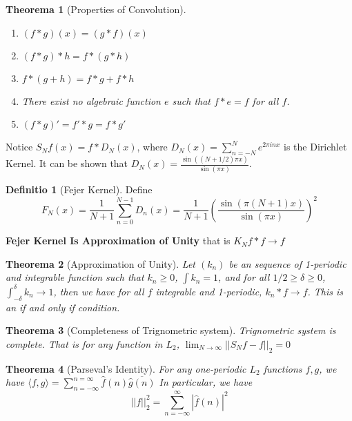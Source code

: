 \documentclass[12pt, a4paper]{article}
\newtheorem{theorem}{Theorema}
\theoremstyle{definition}
\newtheorem{definition}{Definitio}
\theoremstyle{remark}
\begin{document}
\begin{theorem}[Properties of Convolution]
	\begin{enumerate}
		\item $(f*g)(x) = (g*f)(x)$
		\item $(f*g)*h = f*(g*h)$
		\item $f*(g+h) = f*g + f*h$
		\item There exist no algebraic function $e$ such that $f*e = f$ for all $f$.	
		\item $(f * g)' =f' *g = f*g'$
	\end{enumerate}
\end{theorem}

Notice $S_Nf(x) = f * D_N(x)$, where $D_N(x) = \sum _{n = -N}^{N} e^{2\pi inx}$ is the Dirichlet Kernel. It can be shown that $D_N(x) = \frac{\sin((N+1/2)\pi x)}{\sin(\pi x)}$.

\begin{definition}[Fejer Kernel]
	Define $$F_N(x) = \frac{1}{N+1} \sum _{n = 0}^{N-1} D_n(x) = \frac{1}{N+1} \left( \frac{\sin(\pi(N+1)x)}{\sin(\pi x)} \right)^2$$

	\textbf{Fejer Kernel Is Approximation of Unity} that is
	$K_Nf *f \rightarrow f$
\end{definition}

\begin{theorem}[Approximation of Unity]
	Let $(k_n)$ be an sequence of 1-periodic and integrable function such that $k_n \geq 0$, $\int k_n = 1$, and for all $1/2 \geq \delta \geq 0$, $\int_{-\delta} ^{\delta} k_n \rightarrow  1$, then we have for all $f$ integrable and 1-periodic, $k_n * f \rightarrow f$. This is an if and only if condition.
\end{theorem}

\begin{theorem}[Completeness of Trignometric system]
	Trignometric system is complete. That is for any function in $L_2$, $\lim_{N \rightarrow  \infty} || S_Nf -f ||_2 =0$
\end{theorem}

\begin{theorem}[Parseval's Identity]
	For any one-periodic $L_2$ functions $f, g$, we have 
	$\langle f, g \rangle = \sum_{n=-\infty}^{n=\infty}\hat{f}(n)\overline{\hat{g}(n)}$
	In particular, we have
	$$
	||f||_2^2 = \sum_{n = -\infty}^{\infty} |\hat{f}(n)|^2
	$$

\end{theorem}
\end{document}

